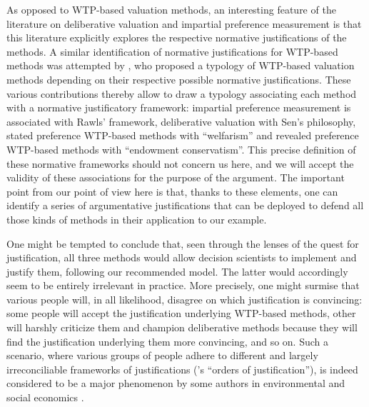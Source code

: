 \documentclass[preprint, french, english, 11pt, authoryear]{elsarticle}%
\begin{document}
As opposed to WTP-based valuation methods, an interesting feature of the literature on deliberative valuation and impartial preference measurement is that this literature explicitly explores the respective normative justifications of the methods. A similar identification of normative justifications for WTP-based methods was attempted by \citet{meinard_ethical_2016}, who proposed a typology of WTP-based valuation methods depending on their respective possible normative justifications. These various contributions thereby allow to draw a typology associating each method with a normative justificatory framework: impartial preference measurement is associated with Rawls' framework, deliberative valuation with Sen's philosophy, stated preference WTP-based methods with ``welfarism'' and revealed preference WTP-based methods with ``endowment conservatism''. This precise definition of these normative frameworks should not concern us here, and we will accept the validity of these associations for the purpose of the argument. The important point from our point of view here is that, thanks to these elements, one can identify a series of argumentative justifications that can be deployed to defend all those kinds of methods in their application to our example.

One might be tempted to conclude that, seen through the lenses of the quest for justification, all three methods would allow decision scientists to implement and justify them, following our recommended model. The latter would accordingly seem to be entirely irrelevant in practice. More precisely, one might surmise that various people will, in all likelihood, disagree on which justification is convincing: some people will accept the justification underlying WTP-based methods, other will harshly criticize them and champion deliberative methods because they will find the justification underlying them more convincing, and so on. Such a scenario, where various groups of people adhere to different and largely irreconciliable frameworks of justifications (\citet{boltanski_justification_2006}'s ``orders of justification''), is indeed considered to be a major phenomenon by some authors in environmental and social economics \citep{chateauraynaud_contrainte_2007}.
\end{document}
